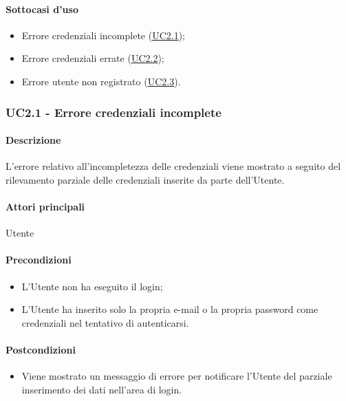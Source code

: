 \paragraph*{Sottocasi d'uso}
\begin{itemize}
  \item Errore credenziali incomplete (\hyperref[UC2point1]{UC2.1});
  \item Errore credenziali errate (\hyperref[UC2point2]{UC2.2});
  \item Errore utente non registrato (\hyperref[UC2point3]{UC2.3}).
\end{itemize}


\subsubsection{UC2.1 - Errore credenziali incomplete}\label{UC2point1}
\paragraph*{Descrizione}
L’errore relativo all’incompletezza delle credenziali viene mostrato a seguito del rilevamento parziale delle credenziali inserite da parte dell’Utente.

\paragraph*{Attori principali}
Utente

\paragraph*{Precondizioni}
\begin{itemize}
  \item L’Utente non ha eseguito il login;
  \item L’Utente ha inserito solo la propria e-mail o la propria password come credenziali nel tentativo di autenticarsi.  
\end{itemize}

\paragraph*{Postcondizioni}
\begin{itemize}
  \item Viene mostrato un messaggio di errore per notificare l’Utente del parziale inserimento dei dati nell’area di login.
\end{itemize}

